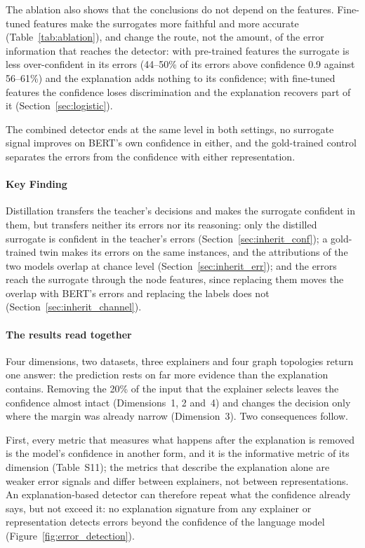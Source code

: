 The ablation also shows that the conclusions do not depend on the features. Fine-tuned features make the surrogates more faithful and more accurate (Table~\ref{tab:ablation}), and change the route, not the amount, of the error information that reaches the detector: with pre-trained features the surrogate is less over-confident in its errors (44--50\% of its errors above confidence 0.9 against 56--61\%) and the explanation adds nothing to its confidence; with fine-tuned features the confidence loses discrimination and the explanation recovers part of it (Section~\ref{sec:logistic}).

The combined detector ends at the same level in both settings, no surrogate signal improves on BERT's own confidence in either, and the gold-trained control separates the errors from the confidence with either representation.

\paragraph{\textbf{Key Finding}}
Distillation transfers the teacher's decisions and makes the surrogate confident in them, but transfers neither its errors nor its reasoning: only the distilled surrogate is confident in the teacher's errors (Section~\ref{sec:inherit_conf}); a gold-trained twin makes its errors on the same instances, and the attributions of the two models overlap at chance level (Section~\ref{sec:inherit_err}); and the errors reach the surrogate through the node features, since replacing them moves the overlap with BERT's errors and replacing the labels does not (Section~\ref{sec:inherit_channel}).

\paragraph{\textbf{The results read together}}
Four dimensions, two datasets, three explainers and four graph topologies return one answer: the prediction rests on far more evidence than the explanation contains. Removing the 20\% of the input that the explainer selects leaves the confidence almost intact (Dimensions~1, 2 and~4) and changes the decision only where the margin was already narrow (Dimension~3). Two consequences follow.

First, every metric that measures what happens after the explanation is removed is the model's confidence in another form, and it is the informative metric of its dimension (Table~S11); the metrics that describe the explanation alone are weaker error signals and differ between explainers, not between representations. An explanation-based detector can therefore repeat what the confidence already says, but not exceed it: no explanation signature from any explainer or representation detects errors beyond the confidence of the language model (Figure~\ref{fig:error_detection}).

